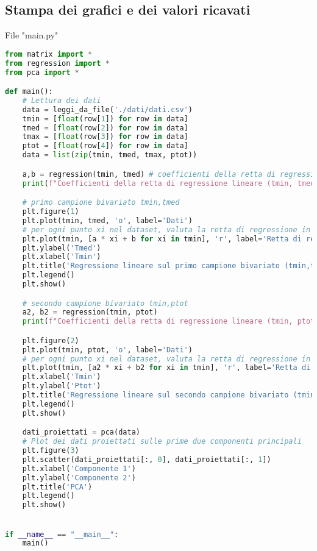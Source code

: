 \documentclass[a4paper]{report}
\begin{document}
\subsection{Stampa dei grafici e dei valori ricavati}

File "main.py"
\begin{lstlisting}[language=Python, breaklines=true]
from matrix import *
from regression import *
from pca import *

def main():
    # Lettura dei dati
    data = leggi_da_file('./dati/dati.csv')
    tmin = [float(row[1]) for row in data]
    tmed = [float(row[2]) for row in data]
    tmax = [float(row[3]) for row in data]
    ptot = [float(row[4]) for row in data]
    data = list(zip(tmin, tmed, tmax, ptot))

    a,b = regression(tmin, tmed) # coefficienti della retta di regressione a*x + b
    print(f"Coefficienti della retta di regressione lineare (tmin, tmed): a = {a}, b = {b}")

    # primo campione bivariato tmin,tmed
    plt.figure(1)
    plt.plot(tmin, tmed, 'o', label='Dati')
    # per ogni punto xi nel dataset, valuta la retta di regressione in quel punto
    plt.plot(tmin, [a * xi + b for xi in tmin], 'r', label='Retta di regressione') 
    plt.ylabel('Tmed')
    plt.xlabel('Tmin')
    plt.title('Regressione lineare sul primo campione bivariato (tmin,tmed)')
    plt.legend()
    plt.show()

    # secondo campione bivariato tmin,ptot
    a2, b2 = regression(tmin, ptot)
    print(f"Coefficienti della retta di regressione lineare (tmin, ptot): a = {a2}, b = {b2}")

    plt.figure(2)
    plt.plot(tmin, ptot, 'o', label='Dati')
    # per ogni punto xi nel dataset, valuta la retta di regressione in quel punto
    plt.plot(tmin, [a2 * xi + b2 for xi in tmin], 'r', label='Retta di regressione')
    plt.xlabel('Tmin')
    plt.ylabel('Ptot')
    plt.title('Regressione lineare sul secondo campione bivariato (tmin,ptot)')
    plt.legend()
    plt.show()

    dati_proiettati = pca(data)
    # Plot dei dati proiettati sulle prime due componenti principali
    plt.figure(3)
    plt.scatter(dati_proiettati[:, 0], dati_proiettati[:, 1])
    plt.xlabel('Componente 1')
    plt.ylabel('Componente 2')
    plt.title('PCA')
    plt.legend()
    plt.show()


if __name__ == "__main__":
    main()
\end{lstlisting}
\end{document}
